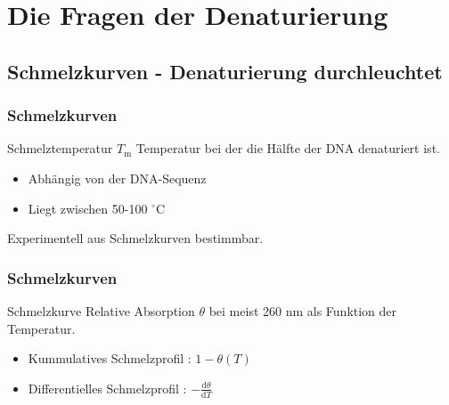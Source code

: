 
\section{Die Fragen der Denaturierung}
\subsection{Schmelzkurven - Denaturierung durchleuchtet}

\begin{frame}
\frametitle{Schmelzkurven}
\begin{block}{Schmelztemperatur $T_\text{m}$}
Temperatur bei der die Hälfte der DNA denaturiert ist.
\begin{itemize}
\item Abhängig von der DNA-Sequenz
\item Liegt zwischen 50-100 $^\circ$C
\end{itemize}
\end{block}
\centering
\vspace{0.5cm}
Experimentell aus Schmelzkurven bestimmbar.
\vspace{0.5cm}
\frametitle{Schmelzkurven}
\begin{block}{Schmelzkurve}
Relative Absorption $\theta$ bei meist 260 nm als Funktion der Temperatur.\\
\begin{itemize}
\item Kummulatives Schmelzprofil :  $1-\theta(T)$
\item Differentielles Schmelzprofil : $-\frac{\text{d}\theta}{\text{d}T}$
\end{itemize}
\end{block}
\end{frame}

